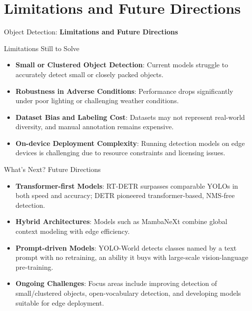 \section{Limitations and Future Directions}
\begin{frame}{}
    \LARGE Object Detection: \textbf{Limitations and Future Directions}
\end{frame}

\begin{frame}{Limitations Still to Solve}
    \begin{itemize}
        \item \textbf{Small or Clustered Object Detection}: Current models struggle to accurately detect small or closely packed objects.
        \item \textbf{Robustness in Adverse Conditions}: Performance drops significantly under poor lighting or challenging weather conditions.
        \item \textbf{Dataset Bias and Labeling Cost}: Datasets may not represent real-world diversity, and manual annotation remains expensive.
        \item \textbf{On-device Deployment Complexity}: Running detection models on edge devices is challenging due to resource constraints and licensing issues.
    \end{itemize}
\end{frame}

\begin{frame}{What’s Next? Future Directions}
    \begin{itemize}
        \item \textbf{Transformer-first Models}: RT-DETR surpasses comparable YOLOs in both speed and accuracy; DETR pioneered transformer-based, NMS-free detection.
        \item \textbf{Hybrid Architectures}: Models such as MambaNeXt combine global context modeling with edge efficiency.
        \item \textbf{Prompt-driven Models}: YOLO-World detects classes named by a text prompt with no retraining, an ability it buys with large-scale vision-language pre-training.
        \item \textbf{Ongoing Challenges}: Focus areas include improving detection of small/clustered objects, open-vocabulary detection, and developing models suitable for edge deployment.
    \end{itemize}
\end{frame}